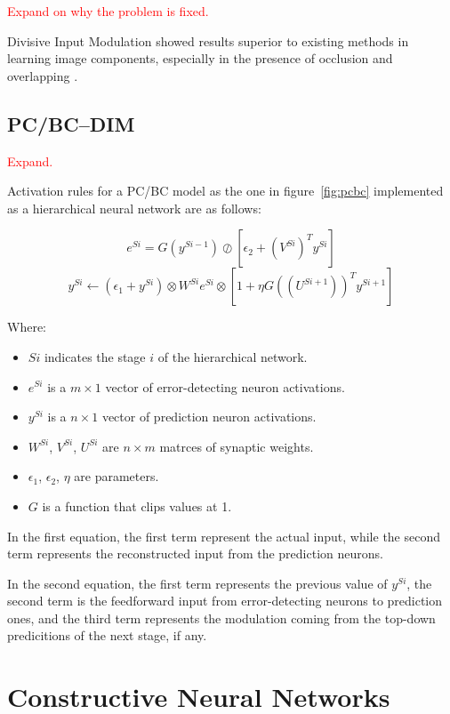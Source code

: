 \documentclass[11pt,a4paper]{report}
\begin{document}
			\textcolor{red}{Expand on why the problem is fixed.}
			
			Divisive Input Modulation showed results superior to existing methods in learning image components, especially in the presence of occlusion and overlapping \cite{spratling2009unsupervised}.
			
			\subsection{PC/BC--DIM}
				\textcolor{red}{Expand.}
				
				Activation rules for a PC/BC model as the one in figure~\ref{fig:pcbc} implemented as a hierarchical neural network are as follows:
				
				$$e^{Si} = G(y^{Si-1}) \oslash [\epsilon_2 + (V^{Si})^T y^{Si}]$$
				$$y^{Si} \leftarrow (\epsilon_1 + y^{Si}) \otimes W^{Si}e^{Si} \otimes [1 + \eta G((U^{Si+1}))^T y^{Si+1}]$$
				
				Where:
				\begin{itemize}
					\item $Si$ indicates the stage $i$ of the hierarchical network.
					\item $e^{Si}$ is a $m \times 1$ vector of error-detecting neuron activations.
					\item $y^{Si}$ is a $n \times 1$ vector of prediction neuron activations.
					\item $W^{Si}$, $V^{Si}$, $U^{Si}$ are $n \times m$ matrces of synaptic weights.
					\item $\epsilon_1$, $\epsilon_2$, $\eta$ are parameters.
					\item $G$ is a function that clips values at 1. 
				\end{itemize}
				
				In the first equation, the first term represent the actual input, while the second term represents the reconstructed input from the prediction neurons.
				
				In the second equation, the first term represents the previous value of $y^{Si}$, the second term is the feedforward input from error-detecting neurons to prediction ones, and the third term represents the modulation coming from the top-down predicitions of the next stage, if any.
				
		\section{Constructive Neural Networks}
		\label{sec:constructive}
\end{document}
